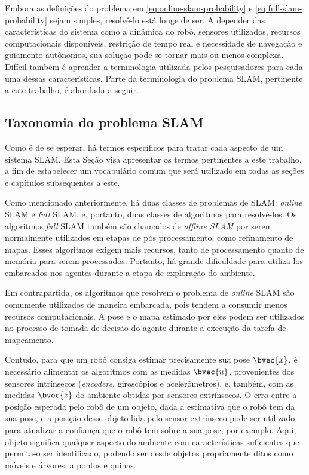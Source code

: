 Embora as definições do problema em \ref{eq:online-slam-probability} e 
\ref{eq:full-slam-probability} sejam simples, resolvê-lo está longe de ser. 
A depender das características do sistema como a dinâmica do robô, sensores utilizados, recursos computacionais disponíveis, restrição de tempo real e 
necessidade de navegação e guiamento autônomos, sua solução pode se tornar mais 
ou menos complexa. Difícil também é aprender a terminologia utilizada pelos 
pesquisadores para cada uma dessas características. Parte da terminologia do problema SLAM,
pertinente a este trabalho, é abordada a seguir.

\subsection*{Taxonomia do problema SLAM}
Como é de se esperar, há termos específicos para tratar cada aspecto de um 
sistema SLAM. Esta Seção visa apresentar os termos pertinentes a este trabalho, 
a fim de estabelecer um vocabulário comum que será utilizado em todas as seções 
e capítulos subsequentes a este.

Como mencionado anteriormente, há duas classes de problemas de SLAM: 
\textit{online} SLAM e \textit{full} SLAM, e, portanto, duas classes de 
algoritmos para resolvê-los. Os algoritmos \textit{full} SLAM também são chamados 
de \emph{offline SLAM} por serem normalmente utilizados em etapas de pós 
processamento, como refinamento de mapas. Esses algoritmos exigem mais 
recursos, tanto de processamento quanto de memória para serem processados. 
Portanto, há grande dificuldade para utiliza-los embarcados nos agentes durante 
a etapa de exploração do ambiente.

Em contrapartida, os algoritmos que resolvem o problema de \textit{online} 
SLAM são comumente utilizados de maneira embarcada, pois tendem a 
consumir menos recursos computacionais. A pose e o mapa estimado por eles podem 
ser utilizados no processo de tomada de decisão do agente durante a execução da 
tarefa de mapeamento. 

Contudo, para que um robô consiga estimar precisamente sua pose $\bvec{x}$, é 
necessário alimentar os algoritmos com as medidas $\bvec{u}$, provenientes dos 
sensores intrínsecos (\textit{encoders}, giroscópios e acelerômetros), e, 
também, com as medidas $\bvec{z}$ do ambiente obtidas por sensores extrínsecos. O erro 
entre a posição esperada pelo robô de um objeto, dada a estimativa que o robô tem da sua pose, e a posição desse objeto lida pelo sensor extrínseco pode ser 
utilizado para atualizar a confiança que o robô tem sobre a sua pose, por 
exemplo. Aqui, objeto significa qualquer aspecto do ambiente com características 
suficientes que permita-o ser identificado, podendo ser desde objetos
propriamente ditos como móveis e árvores, a pontos e quinas.


